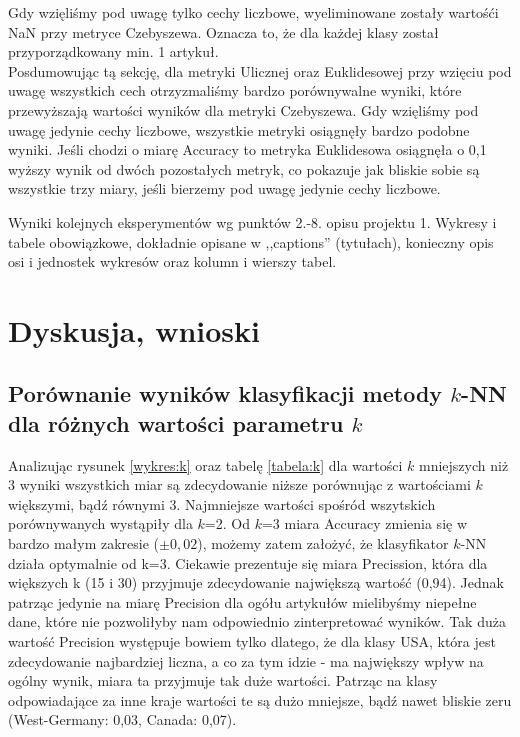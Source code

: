 \documentclass{classrep}
\begin{document}
Gdy wzięliśmy pod uwagę tylko cechy liczbowe, wyeliminowane zostały wartośći NaN przy metryce Czebyszewa. Oznacza to, że dla każdej klasy został przyporządkowany min. 1 artykuł.
\\
Posdumowując tą sekcję, dla metryki Ulicznej oraz Euklidesowej przy wzięciu pod uwagę wszystkich cech otrzyzmaliśmy bardzo porównywalne wyniki, które przewyższają wartości wyników dla metryki Czebyszewa. Gdy wzięliśmy pod uwagę jedynie cechy liczbowe, wszystkie metryki osiągnęły bardzo podobne wyniki. Jeśli chodzi o miarę Accuracy to metryka Euklidesowa osiągnęła o 0,1 wyższy wynik od dwóch pozostałych metryk, co pokazuje jak bliskie sobie są wszystkie trzy miary, jeśli bierzemy pod uwagę jedynie cechy liczbowe.

Wyniki kolejnych eksperymentów wg punktów 2.-8. opisu projektu 1.  Wykresy i tabele
obowiązkowe, dokładnie opisane w ,,captions'' (tytułach), konieczny opis osi i
jednostek wykresów oraz kolumn i wierszy tabel.\\ 


\clearpage
\section{Dyskusja, wnioski}
\subsection{Porównanie wyników klasyfikacji metody $k$-NN dla różnych wartości parametru $k$}

Analizując rysunek \ref{wykres:k} oraz tabelę \ref{tabela:k} dla wartości $k$ mniejszych niż 3 wyniki wszystkich miar są zdecydowanie niższe porównując z wartościami $k$ większymi, bądź równymi 3. Najmniejsze wartości spośród wszytskich porównywanych wystąpiły dla $k$=2. Od $k$=3 miara Accuracy zmienia się w bardzo małym zakresie ($\pm 0,02$), możemy zatem założyć, że klasyfikator $k$-NN działa optymalnie od k=3. Ciekawie prezentuje się miara Precission, która dla większych k (15 i 30) przyjmuje zdecydowanie największą wartość (0,94). Jednak patrząc jedynie na miarę Precision dla ogółu artykułów mielibyśmy niepełne dane, które nie pozwoliłyby nam odpowiednio zinterpretować wyników. Tak duża wartość Precision występuje bowiem tylko dlatego, że dla klasy USA, która jest zdecydowanie najbardziej liczna, a co za tym idzie - ma największy wpływ na ogólny wynik, miara ta przyjmuje tak duże wartości. Patrząc na klasy odpowiadające za inne kraje wartości te są dużo mniejsze, bądź nawet bliskie zeru (West-Germany: 0,03, Canada: 0,07).
\end{document}
